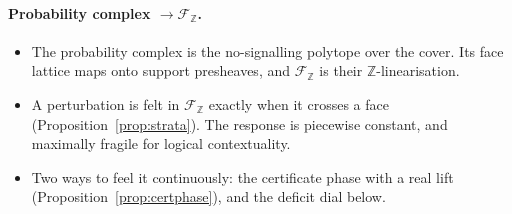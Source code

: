 \documentclass[11pt]{article}
\theoremstyle{definition}
\theoremstyle{remark}
\newcommand{\Z}{\mathbb{Z}}
\begin{document}
\paragraph{Probability complex $\to\mathcal F_{\Z}$.}
\begin{itemize}
  \item The probability complex is the no-signalling polytope over the cover. Its face lattice maps onto support presheaves, and $\mathcal F_{\Z}$ is their $\Z$-linearisation.
  \item A perturbation is felt in $\mathcal F_{\Z}$ exactly when it crosses a face (Proposition~\ref{prop:strata}). The response is piecewise constant, and maximally fragile for logical contextuality.
  \item Two ways to feel it continuously: the certificate phase with a real lift (Proposition~\ref{prop:certphase}), and the deficit dial below.
\end{itemize}
\end{document}
